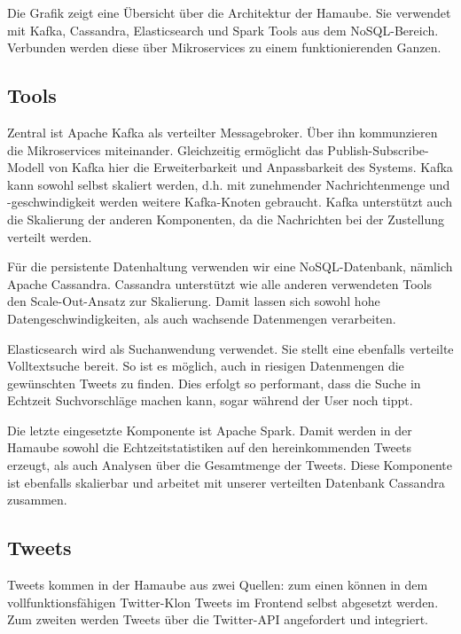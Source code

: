 



Die Grafik zeigt eine Übersicht über die Architektur der Hamaube. Sie
verwendet mit Kafka, Cassandra, Elasticsearch und Spark Tools aus dem
NoSQL-Bereich. Verbunden werden diese über Mikroservices zu einem
funktionierenden Ganzen.

\subsection{Tools}
Zentral ist Apache Kafka als verteilter Messagebroker. Über ihn
kommunzieren die Mikroservices miteinander. Gleichzeitig ermöglicht das
Publish-Subscribe-Modell von Kafka hier die Erweiterbarkeit und
Anpassbarkeit des Systems. Kafka  kann sowohl selbst skaliert werden,
d.h. mit zunehmender Nachrichtenmenge und -geschwindigkeit werden
weitere Kafka-Knoten gebraucht. Kafka unterstützt auch die Skalierung
der anderen Komponenten, da die Nachrichten bei der Zustellung verteilt
werden.

Für die persistente Datenhaltung verwenden wir eine NoSQL-Datenbank, nämlich
Apache Cassandra. Cassandra unterstützt wie alle anderen verwendeten
Tools den Scale-Out-Ansatz zur Skalierung. Damit lassen sich sowohl
hohe Datengeschwindigkeiten, als auch wachsende Datenmengen
verarbeiten.

Elasticsearch wird als Suchanwendung verwendet. Sie stellt eine
ebenfalls verteilte Volltextsuche bereit. So ist es möglich, auch in
riesigen Datenmengen die gewünschten Tweets zu finden. Dies erfolgt so
performant, dass die Suche in Echtzeit Suchvorschläge machen kann,
sogar während der User noch tippt.

Die letzte eingesetzte Komponente ist Apache Spark. Damit werden in der
Hamaube sowohl die Echtzeitstatistiken auf den hereinkommenden Tweets
erzeugt, als auch Analysen über die Gesamtmenge der Tweets. Diese
Komponente ist ebenfalls skalierbar und arbeitet mit unserer verteilten
Datenbank Cassandra zusammen.

\subsection{Tweets}
Tweets kommen in der Hamaube aus zwei Quellen: zum einen können in dem
vollfunktionsfähigen Twitter-Klon Tweets im Frontend selbst abgesetzt
werden. Zum zweiten werden Tweets über die Twitter-API angefordert und
integriert.


